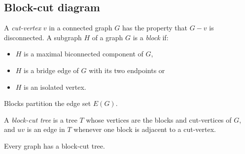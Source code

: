 \subsection{Block-cut diagram}
A \textit{cut-vertex} $v$ in a connected graph $G$ has the property that $G - v$ is disconnected.
A subgraph $H$ of a graph $G$ is a \textit{block} if:
\begin{itemize}
	\item $H$ is a maximal biconnected component of $G$,
	\item $H$ is a bridge edge of $G$ with its two endpoints or
	\item $H$ is an isolated vertex.
\end{itemize}

\begin{theorem}
	Blocks partition the edge set $E(G)$.
\end{theorem}

A \textit{block-cut tree} is a tree $T$ whose vertices are the blocks and cut-vertices of $G$, and $uv$ is an edge in $T$ whenever one block is adjacent to a cut-vertex. 

\begin{theorem}\label{thm:block-cut tree}
	Every graph has a block-cut tree.
\end{theorem}